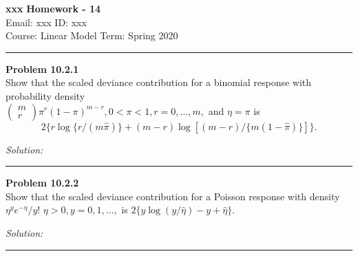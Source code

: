 \documentclass[a4paper, 11pt]{article}
\newenvironment{problem}[2][Problem]
    { \begin{mdframed}[backgroundcolor=gray!20] \textbf{#1 #2} \\}
    {  \end{mdframed}}
\newenvironment{solution}
    {\textit{Solution:}}
    {}
\begin{document}
\noindent
\large\textbf{xxx} \hfill \textbf{Homework - 14}   \\
Email: xxx \hfill ID: xxx \\
\normalsize Course: Linear Model   \hfill Term: Spring 2020\\
\noindent\rule{7in}{2.8pt}
\begin{problem}{10.2.1}
Show that the scaled deviance contribution for a binomial response with probability density 
\\
$\left(\begin{array}{l}m \\ r\end{array}\right) \pi^{r}(1-\pi)^{m-r}, 0<\pi<1, r=0, \ldots, m,$ and $\eta=\pi$ is
    $$
    2\{r \log \{r /(m \widehat{\pi})\}+(m-r) \log [(m-r) /\{m(1-\widehat{\pi})\}]\}.
    $$
\end{problem}
\begin{solution}

\end{solution}

\noindent\rule{7in}{2.8pt}

\begin{problem}{10.2.2}
Show that the scaled deviance contribution for a Poisson response with density $\eta^{y} e^{-\eta} / y !$ $\eta>0, y=0,1, \ldots,$ is $2\{y \log (y / \widehat{\eta})-y+\widehat{\eta}\}.$
\end{problem}
\begin{solution}

\end{solution}

\noindent\rule{7in}{2.8pt}


\end{document}
